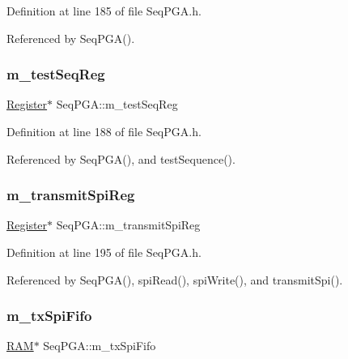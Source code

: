 Definition at line 185 of file Seq\+P\+G\+A.\+h.



Referenced by Seq\+P\+G\+A().

\mbox{\label{classSeqPGA_a7478537516c951a4d08f23b0789ed6d9}} 
\subsubsection{\texorpdfstring{m\+\_\+test\+Seq\+Reg}{m\_testSeqReg}}
{\footnotesize\ttfamily \hyperlink{classRegister}{Register}$\ast$ Seq\+P\+G\+A\+::m\+\_\+test\+Seq\+Reg\hspace{0.3cm}{\ttfamily [private]}}



Definition at line 188 of file Seq\+P\+G\+A.\+h.



Referenced by Seq\+P\+G\+A(), and test\+Sequence().

\mbox{\label{classSeqPGA_a4e0ffb37b1cd947d389354ac25723ab8}} 
\subsubsection{\texorpdfstring{m\+\_\+transmit\+Spi\+Reg}{m\_transmitSpiReg}}
{\footnotesize\ttfamily \hyperlink{classRegister}{Register}$\ast$ Seq\+P\+G\+A\+::m\+\_\+transmit\+Spi\+Reg\hspace{0.3cm}{\ttfamily [private]}}



Definition at line 195 of file Seq\+P\+G\+A.\+h.



Referenced by Seq\+P\+G\+A(), spi\+Read(), spi\+Write(), and transmit\+Spi().

\mbox{\label{classSeqPGA_a6fbdd81928bb5d0fcd671ae2facaef11}} 
\subsubsection{\texorpdfstring{m\+\_\+tx\+Spi\+Fifo}{m\_txSpiFifo}}
{\footnotesize\ttfamily \hyperlink{classRAM}{R\+AM}$\ast$ Seq\+P\+G\+A\+::m\+\_\+tx\+Spi\+Fifo\hspace{0.3cm}{\ttfamily [private]}}



